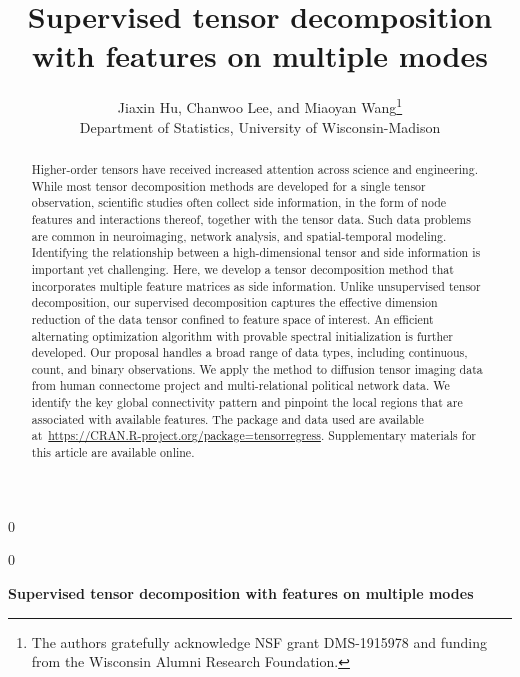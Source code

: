 \documentclass[12pt]{article}
\newcommand{\blind}{0}
\theoremstyle{definition}
\theoremstyle{definition}
\begin{document}
%

\def\spacingset#1{\renewcommand{\baselinestretch}%
{#1}\small\normalsize} \spacingset{1}




\blind
{
  \title{\bf Supervised tensor decomposition with features on multiple modes}
  \author{Jiaxin Hu, Chanwoo Lee, and Miaoyan Wang\thanks{The authors gratefully acknowledge NSF grant DMS-1915978 and funding from the Wisconsin Alumni Research Foundation. }\hspace{.2cm}\\
    Department of Statistics, University of Wisconsin-Madison}
  \maketitle
  
  
  
} \fi

\blind
{
  \bigskip
  \bigskip
  \bigskip
  \begin{center}
    {\LARGE\bf Supervised tensor decomposition with features on multiple modes}
\end{center}
  \medskip
} \fi


\bigskip
\begin{abstract}
Higher-order tensors have received increased attention across science and engineering. While most tensor decomposition methods are developed for a single tensor observation, scientific studies often collect side information, in the form of node features and interactions thereof, together with the tensor data. Such data problems are common in neuroimaging, network analysis, and spatial-temporal modeling. Identifying the relationship between a high-dimensional tensor and side information is important yet challenging. Here, we develop a tensor decomposition method that incorporates multiple feature matrices as side information. Unlike unsupervised tensor decomposition, our supervised decomposition captures the effective dimension reduction of the data tensor confined to feature space of interest. An efficient alternating optimization algorithm with provable spectral initialization is further developed. Our proposal handles a broad range of data types, including continuous, count, and binary observations. We apply the method to diffusion tensor imaging data from human connectome project and multi-relational political network data. We identify the key global connectivity pattern and pinpoint the local regions that are associated with available features. The package and data used are available at~\url{https://CRAN.R-project.org/package=tensorregress}. Supplementary materials for this article are available online.

\end{abstract}
\end{document}
